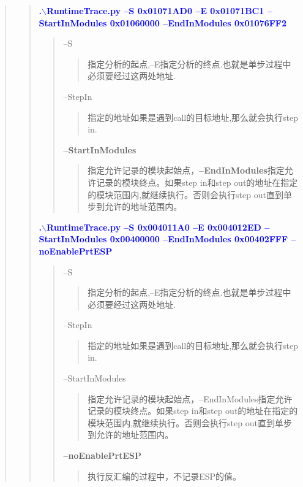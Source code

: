 \documentclass[AutoFakeBold,AutoFakeSlant]{article}
\begin{document}
\begin{flushleft}
\begin{quote}
\begin{quote}
			\clearpage
			
			\textcolor{blue}{ \textbf{ \Large
		    .$\backslash$RuntimeTrace.py --S 0x01071AD0 --E 0x01071BC1 --StartInModules 0x01060000 --EndInModules 0x01076FF2 }} \\
		    \begin{quote}
			    --S \begin{quote}指定分析的起点,--E指定分析的终点.也就是单步过程中必须要经过这两处地址.\end{quote}
			    --StepIn \begin{quote}指定的地址如果是遇到call的目标地址,那么就会执行step in.\end{quote}
			    \textbf{--StartInModules} \begin{quote}指定允许记录的模块起始点，\textbf{--EndInModules}指定允许记录的模块终点。如果step in和step out的地址在指定的模块范围内,就继续执行。否则会执行step out直到单步到允许的地址范围内。\end{quote}
			\end{quote}
		    
			\bigskip
			\bigskip
		    
		    \textcolor{blue}{ \textbf{ \Large
			.$\backslash$RuntimeTrace.py --S 0x004011A0 --E 0x004012ED --StartInModules 0x00400000 --EndInModules 0x00402FFF --noEnablePrtESP }} \\
			\begin{quote}
				--S \begin{quote}指定分析的起点,--E指定分析的终点.也就是单步过程中必须要经过这两处地址.\end{quote}
				--StepIn \begin{quote}指定的地址如果是遇到call的目标地址,那么就会执行step in.\end{quote}
				--StartInModules \begin{quote}指定允许记录的模块起始点，--EndInModules指定允许记录的模块终点。如果step in和step out的地址在指定的模块范围内,就继续执行。否则会执行step out直到单步到允许的地址范围内。\end{quote}
				\textbf{--noEnablePrtESP} \begin{quote}执行反汇编的过程中，不记录ESP的值。\end{quote}
			\end{quote}
			

\end{quote}
\end{quote}
\end{flushleft}
\end{document}
